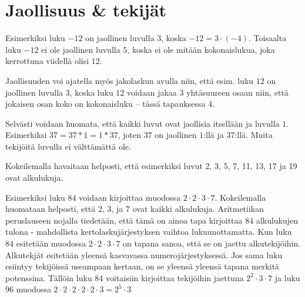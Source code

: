 \chapter{Jaollisuus \& tekijät}


Esimerkiksi luku $-12$ on jaollinen luvulla $3$, koska $-12=3\cdot (-4)$. Toisaalta luku $-12$ ei ole jaollinen luvulla $5$, koska ei ole mitään kokonaislukua, joka kerrottuna viidellä olisi $12$.

Jaollisuuden voi ajatella myös jakolaskun avulla niin, että esim. luku $12$ on jaollinen luvulla $3$, koska luku $12$ voidaan jakaa $3$ yhtäsuureen osaan niin, että jokaisen osan koko on kokonaisluku -- tässä tapauksessa $4$.

Selvästi voidaan huomata, että kaikki luvut ovat jaollisia itsellään ja luvulla $1$. Esimerkiksi $37=37*1=1*37$, joten $37$ on jaollinen $1$:llä ja $37$:llä. Muita tekijöitä luvulla ei välttämättä ole.


Kokeilemalla havaitaan helposti, että esimerkiksi luvut 2, 3, 5, 7, 11, 13, 17 ja 19 ovat alkulukuja. 


Esimerkiksi luku $84$ voidaan kirjoittaa muodossa $2\cdot 2\cdot 3\cdot 7$. Kokeilemalla huomataan helposti, että 2, 3, ja 7 ovat kaikki alkulukuja. Aritmetiikan peruslauseen nojalla tiedetään, että tämä on ainoa tapa kirjoittaa $84$ alkulukujen tulona - mahdollista kertolaskujärjestyksen vaihtoa lukuunottamatta. Kun luku $84$ esitetään muodossa $2\cdot 2\cdot 3\cdot 7$ on tapana sanoa, että se on jaettu alkutekijöihin. Alkutekjät esitetään yleensä kasvavassa numerojärjestyksessä. Jos sama luku esiintyy tekijöissä useampaan kertaan, on se yleensä yleensä tapana merkitä potenssina. Tällöin luku $84$ voitaisiin kirjoittaa tekijöihin jaettuna $2^2\cdot 3\cdot 7$ ja luku $96$ muodossa $2\cdot 2\cdot 2\cdot 2\cdot 2\cdot 3=2^5\cdot 3$